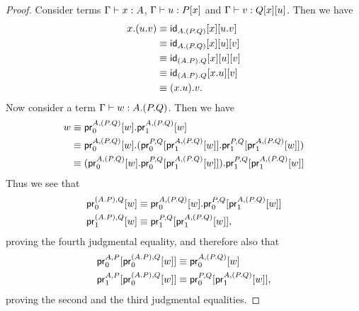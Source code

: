 \begin{proof}
Consider terms $\jterm{\Gamma}{A}{x}$, $\jterm{\Gamma}{\subst{x}{P}}{u}$ and
$\jterm{\Gamma}{\subst{u}{{x}{Q}}}{v}$. Then we have
\begin{align*}
\tmext{A}{{P}{Q}}{x}{{u}{v}} & \jdeq \subst{\tmext{P}{Q}{u}{v}}{{x}{\idfunc[\ctxext{A}{{P}{Q}}]}}\\
& \jdeq \subst{v}{{u}{{x}{\idfunc[\ctxext{A}{{P}{Q}}]}}}\\
& \jdeq \subst{v}{{u}{{x}{\idfunc[\ctxext{{A}{P}}{Q}]}}}\\
& \jdeq \subst{v}{{\tmext{A}{P}{x}{u}}{\idfunc[\ctxext{{A}{P}}{Q}]}}\\
& \jdeq \tmext{{A}{P}}{Q}{{x}{u}}{v}.
\end{align*}
Now consider a term $\jterm{\Gamma}{\ctxext{A}{{P}{Q}}}{w}$. Then we have
\begin{align*}
w 
& \jdeq \tmext{A}{{P}{Q}}{\cprojfst{A}{\ctxext{P}{Q}}{w}}{\cprojsnd{A}{\ctxext{P}{Q}}{w}}\\
& \jdeq \tmext{A}{{P}{Q}}{\cprojfst{A}{\ctxext{P}{Q}}{w}}{{\cprojfst{P}{Q}{\cprojsnd{A}{\ctxext{P}{Q}}{w}}}{\cprojsnd{P}{Q}{\cprojsnd{A}{\ctxext{P}{Q}}{w}}}}\\
& \jdeq \tmext{{A}{P}}{Q}{{\cprojfst{A}{\ctxext{P}{Q}}{w}}{\cprojfst{P}{Q}{\cprojsnd{A}{\ctxext{P}{Q}}{w}}}}{\cprojsnd{P}{Q}{\cprojsnd{A}{\ctxext{P}{Q}}{w}}}
\end{align*}
Thus we see that 
\begin{align*}
\cprojfst{\ctxext{A}{P}}{Q}{w} & \jdeq \tmext{A}{P}{\cprojfst{A}{\ctxext{P}{Q}}{w}}{\cprojfst{P}{Q}{\cprojsnd{A}{\ctxext{P}{Q}}{w}}}\\ 
\cprojsnd{\ctxext{A}{P}}{Q}{w} & \jdeq \cprojsnd{P}{Q}{\cprojsnd{A}{\ctxext{P}{Q}}{w}},
\end{align*}
proving the fourth judgmental equality, and therefore also that
\begin{align*}
\cprojfst{A}{P}{\cprojfst{\ctxext{A}{P}}{Q}{w}} & \jdeq \cprojfst{A}{\ctxext{P}{Q}}{w}\\
\cprojsnd{A}{P}{\cprojfst{\ctxext{A}{P}}{Q}{w}} & \jdeq \cprojfst{P}{Q}{\cprojsnd{A}{\ctxext{P}{Q}}{w}},
\end{align*}
proving the second and the third judgmental equalities.
\end{proof}

